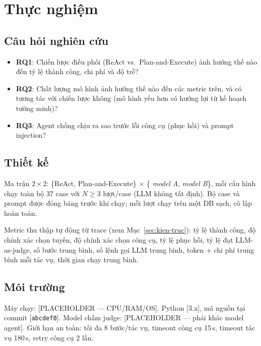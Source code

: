 \section{Thực nghiệm}
\label{sec:thuc-nghiem}


\subsection{Câu hỏi nghiên cứu}

\begin{itemize}
  \item \textbf{RQ1}: Chiến lược điều phối (ReAct vs.\ Plan-and-Execute) ảnh
        hưởng thế nào đến tỷ lệ thành công, chi phí và độ trễ?
  \item \textbf{RQ2}: Chất lượng mô hình ảnh hưởng thế nào đến các metric trên,
        và có tương tác với chiến lược không (mô hình yếu hơn có hưởng lợi từ
        kế hoạch tường minh)?
  \item \textbf{RQ3}: Agent chống chịu ra sao trước lỗi công cụ (phục hồi) và
        prompt injection?
\end{itemize}

\subsection{Thiết kế}

Ma trận $2 \times 2$: \{ReAct, Plan-and-Execute\} $\times$ \{%
\emph{model A}, \emph{model B}\}, mỗi cấu hình chạy toàn bộ 37 case với
$N \geq 3$ lượt/case (LLM không tất định). Bộ case và prompt được đóng băng
trước khi chạy; mỗi lượt chạy trên một DB sạch, cô lập hoàn toàn.

Metric thu thập tự động từ trace (xem Mục~\ref{sec:kien-truc}): tỷ lệ thành
công, độ chính xác chọn tuyến, độ chính xác chọn công cụ, tỷ lệ phục hồi,
tỷ lệ đạt LLM-as-judge, số bước trung bình, số lệnh gọi LLM trung bình,
token + chi phí trung bình mỗi tác vụ, thời gian chạy trung bình.

\subsection{Môi trường}

Máy chạy: [PLACEHOLDER --- CPU/RAM/OS]. Python [3.x], mã nguồn tại commit
[\texttt{abcdef0}]. Model chấm judge: [PLACEHOLDER --- phải khác model agent].
Giới hạn an toàn: tối đa 8 bước/tác vụ, timeout công cụ 15\,s, timeout tác vụ
180\,s, retry công cụ 2 lần.
